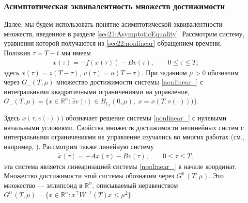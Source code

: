 \documentclass[../main.tex]{subfiles}
\begin{document}
\subsubsection{Асимптотическая эквивалентность множеств достижимости}

Далее, мы будем использовать понятие асимптотической эквивалентности множеств, введенное в разделе \ref{sec21:AsymptoticEquality}. 
Рассмотрим систему, уравнения которой получаются из \eqref{sec22:nonlinear} обращением времени. Положив $\tau=T-t$ мы имеем
\begin{gather}\label{nonlinear_}
			\dot{x}(\tau)=-f(x(\tau))-B v(\tau),\qquad 0 \leqslant \tau \leqslant T; 
\end{gather}
здесь $x(\tau)=z(T-\tau)$, $v(\tau)=u(T-\tau)$.
При заданном $\mu>0$ обозначим через $ G_{-} (T,\mu)$ множество достижимости системы \eqref{nonlinear_} с интегральными квадратичными ограничениями на управление, $G_{-}(T,\mu)=\{x\in \mathbb{R}^n:\exists v(\cdot)\in B_{\mathbb{L}_2}(0,\mu),\; x=x( T,v(\cdot)))\}$.
		 
Здесь $x( \tau,v(\cdot)))$ обозначает решение системы  \eqref{nonlinear_} с нулевыми начальными условиями. 
Свойства множеств достижимости нелинейных систем с интегральными ограничениями на управление изучались во многих работах (см., например, \cite{Guseinov,Rousse,GusZykIFAC}).
Рассмотрим также линейную систему 
\begin{gather}\label{linear_}
			\dot{x}(\tau)=-Ax(\tau)-B v(\tau),\qquad 0 \leqslant \tau \leqslant T; 
\end{gather}
эта система является линеаризацией системы  \eqref{nonlinear_} в начале координат. 
Множество достижимости этой системы обозначим через $G_{-}^0(T,\mu)$. 
Это множество --- эллипсоид в $\mathbb{R}^n$, описываемый неравенством $G_{-}^0(T,\mu)=\{x \in \mathbb{R}^n: x^\top W^{-1}(T)x\leqslant \mu^2\}$.			

\end{document}
